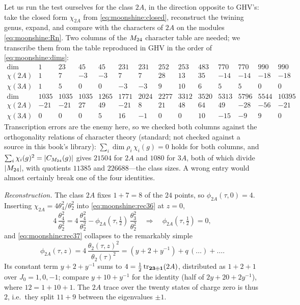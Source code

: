 Let us run the test ourselves for the class $2A$, in the direction opposite to GHV's: take
the closed form $\chi_{2A}$ from \eqref{eq:moonshine:closed}, reconstruct the twining
genus, expand, and compare with the characters of $2A$ on the modules
\eqref{eq:moonshine:Rn}. Two columns of the $M_{24}$ character table are needed; we transcribe
them from the table reproduced in GHV  in the order of
\eqref{eq:moonshine:dims}:
{\small\begin{equation}\label{eq:moonshine:chars}
\begin{array}{r|rrrrrrrrrrrrr}
 \dim & 1&23&45&45&231&231&252&253&483&770&770&990&990\\
 \chi(2A)&1&7&-3&-3&7&7&28&13&35&-14&-14&-18&-18\\
 \chi(3A)&1&5&0&0&-3&-3&9&10&6&5&5&0&0\\[2pt]
 \dim &1035&1035&1035&1265&1771&2024&2277&3312&3520&5313&5796&5544&\!10395\\
 \chi(2A)&-21&-21&27&49&-21&8&21&48&64&49&-28&-56&-21\\
 \chi(3A)&0&0&0&5&16&-1&0&0&10&-15&-9&9&0
\end{array}
\end{equation}}
Transcription errors are the enemy here, so we checked both columns against the
orthogonality relations of character theory (standard; not checked against a source in this
book's library): $\sum_i\dim\rho_i\,\chi_i(g)=0$ holds for both columns, and
$\sum_i\chi_i(g)^2=|C_{M_{24}}(g)|$ gives $21504$ for $2A$ and $1080$ for $3A$, both of which
divide $|M_{24}|$, with quotients $11385$ and $226688$---the class sizes. A wrong entry would
almost certainly break one of the four identities.

\emph{Reconstruction.} The class $2A$ fixes $1+7=8$ of the $24$ points, so
$\phi_{2A}(\tau,0)=4$. Inserting $\chi_{2A}=4\theta_4^2/\theta_2^2$ into
\eqref{eq:moonshine:rec36} at $z=0$,
\[
  4\,\frac{\theta_4^2}{\theta_2^2}=4\,\frac{\theta_4^2}{\theta_2^2}
  -\phi_{2A}(\tau,\tfrac12)\,\frac{\theta_3^2}{\theta_2^2}
  \quad\Longrightarrow\quad \phi_{2A}(\tau,\tfrac12)=0,
\]
and \eqref{eq:moonshine:rec37} collapses to the remarkably simple
\begin{equation}\label{eq:moonshine:phi2A}
  \phi_{2A}(\tau,z)=4\,\frac{\theta_2(\tau,z)^2}{\theta_2(\tau)^2}
  =(y+2+y^{-1})+q\,(\dots)+\dots .
\end{equation}
Its constant term $y+2+y^{-1}$ sums to $4=\tfrac12\operatorname{tr}_{\mathbf{23}\oplus\mathbf1}(2A)$,
distributed as $1+2+1$ over $J_0=1,0,-1$; compare $y+10+y^{-1}$ for the identity (half of
$2y+20+2y^{-1}$), where $12=1+10+1$. The $2A$ trace over the twenty states of charge zero
is thus $2$, i.e.\ they split $11+9$ between the eigenvalues $\pm1$.

